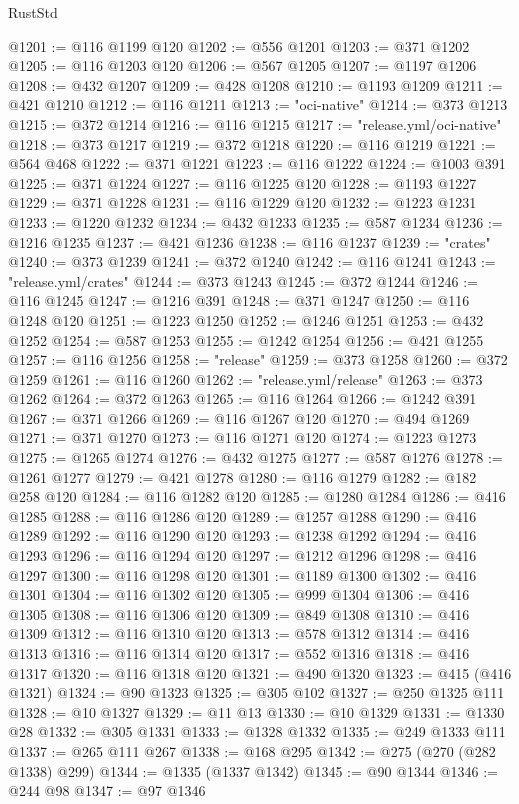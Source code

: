 \begin{lexlean}{RustStd}
\begin{coremodule}
@1201 := @116 @1199 @120
@1202 := @556 @1201
@1203 := @371 @1202
@1205 := @116 @1203 @120
@1206 := @567 @1205
@1207 := @1197 @1206
@1208 := @432 @1207
@1209 := @428 @1208
@1210 := @1193 @1209
@1211 := @421 @1210
@1212 := @116 @1211
@1213 := "oci-native"
@1214 := @373 @1213
@1215 := @372 @1214
@1216 := @116 @1215
@1217 := "release.yml/oci-native"
@1218 := @373 @1217
@1219 := @372 @1218
@1220 := @116 @1219
@1221 := @564 @468
@1222 := @371 @1221
@1223 := @116 @1222
@1224 := @1003 @391
@1225 := @371 @1224
@1227 := @116 @1225 @120
@1228 := @1193 @1227
@1229 := @371 @1228
@1231 := @116 @1229 @120
@1232 := @1223 @1231
@1233 := @1220 @1232
@1234 := @432 @1233
@1235 := @587 @1234
@1236 := @1216 @1235
@1237 := @421 @1236
@1238 := @116 @1237
@1239 := "crates"
@1240 := @373 @1239
@1241 := @372 @1240
@1242 := @116 @1241
@1243 := "release.yml/crates"
@1244 := @373 @1243
@1245 := @372 @1244
@1246 := @116 @1245
@1247 := @1216 @391
@1248 := @371 @1247
@1250 := @116 @1248 @120
@1251 := @1223 @1250
@1252 := @1246 @1251
@1253 := @432 @1252
@1254 := @587 @1253
@1255 := @1242 @1254
@1256 := @421 @1255
@1257 := @116 @1256
@1258 := "release"
@1259 := @373 @1258
@1260 := @372 @1259
@1261 := @116 @1260
@1262 := "release.yml/release"
@1263 := @373 @1262
@1264 := @372 @1263
@1265 := @116 @1264
@1266 := @1242 @391
@1267 := @371 @1266
@1269 := @116 @1267 @120
@1270 := @494 @1269
@1271 := @371 @1270
@1273 := @116 @1271 @120
@1274 := @1223 @1273
@1275 := @1265 @1274
@1276 := @432 @1275
@1277 := @587 @1276
@1278 := @1261 @1277
@1279 := @421 @1278
@1280 := @116 @1279
@1282 := @182 @258 @120
@1284 := @116 @1282 @120
@1285 := @1280 @1284
@1286 := @416 @1285
@1288 := @116 @1286 @120
@1289 := @1257 @1288
@1290 := @416 @1289
@1292 := @116 @1290 @120
@1293 := @1238 @1292
@1294 := @416 @1293
@1296 := @116 @1294 @120
@1297 := @1212 @1296
@1298 := @416 @1297
@1300 := @116 @1298 @120
@1301 := @1189 @1300
@1302 := @416 @1301
@1304 := @116 @1302 @120
@1305 := @999 @1304
@1306 := @416 @1305
@1308 := @116 @1306 @120
@1309 := @849 @1308
@1310 := @416 @1309
@1312 := @116 @1310 @120
@1313 := @578 @1312
@1314 := @416 @1313
@1316 := @116 @1314 @120
@1317 := @552 @1316
@1318 := @416 @1317
@1320 := @116 @1318 @120
@1321 := @490 @1320
@1323 := @415 (@416 @1321)
@1324 := @90 @1323
@1325 := @305 @102
@1327 := @250 @1325 @111
@1328 := @10 @1327
@1329 := @11 @13
@1330 := @10 @1329
@1331 := @1330 @28
@1332 := @305 @1331
@1333 := @1328 @1332
@1335 := @249 @1333 @111
@1337 := @265 @111 @267
@1338 := @168 @295
@1342 := @275 (@270 (@282 @1338) @299)
@1344 := @1335 (@1337 @1342)
@1345 := @90 @1344
@1346 := @244 @98
@1347 := @97 @1346

\end{coremodule}
\end{lexlean}
